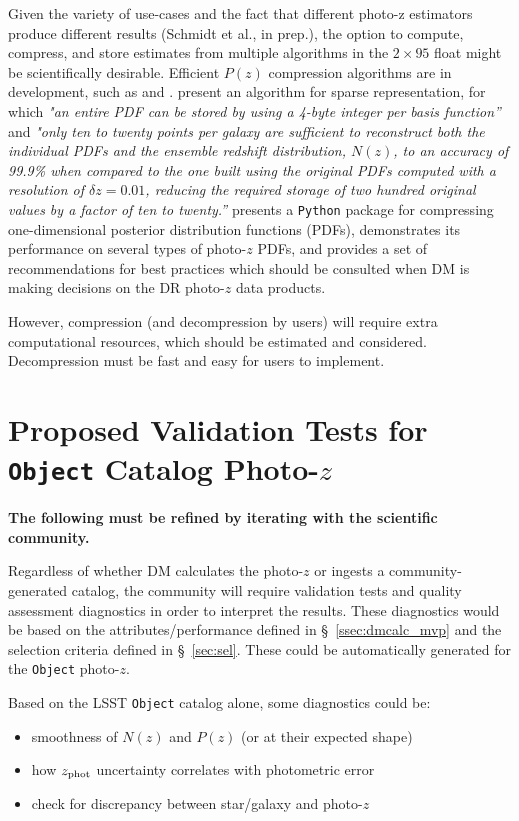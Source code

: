 \documentclass[DM,lsstdraft,toc]{lsstdoc}
\begin{document}
Given the variety of use-cases and the fact that different photo-z estimators produce different results (Schmidt et al., in prep.), the option to compute, compress, and store estimates from multiple algorithms in the $2\times95$ float might be scientifically desirable.
Efficient $P(z)$ compression algorithms are in development, such as \citet{2014MNRAS.441.3550C} and \citet{2018AJ....156...35M}.
\citet{2014MNRAS.441.3550C} present an algorithm for sparse representation, for which {\it "an entire PDF can be stored by using a 4-byte integer per basis function''} and {\it "only ten to twenty points per galaxy are sufficient to reconstruct both the individual PDFs and the ensemble redshift distribution, $N(z)$, to an accuracy of 99.9\% when compared to the one built using the original PDFs computed with a resolution of $\delta z = 0.01$, reducing the required storage of two hundred original values by a factor of ten to twenty.''} 
\citet{2018AJ....156...35M} presents a {\tt Python} package for compressing one-dimensional posterior distribution functions (PDFs), demonstrates its performance on several types of photo-$z$ PDFs, and provides a set of recommendations for best practices which should be consulted when DM is making decisions on the DR photo-$z$ data products.

However, compression (and decompression by users) will require extra computational resources, which should be estimated and considered.
Decompression must be fast and easy for users to implement.



\clearpage
\section{Proposed Validation Tests for {\tt Object} Catalog Photo-$z$} \label{sec:validation}

{\bf The following must be refined by iterating with the scientific community.}

Regardless of whether DM calculates the photo-$z$ or ingests a community-generated catalog, the community will require validation tests and quality assessment diagnostics in order to interpret the results.
These diagnostics would be based on the attributes/performance defined in \S~\ref{ssec:dmcalc_mvp} and the selection criteria defined in \S~\ref{sec:sel}. 
These could be automatically generated for the {\tt Object} photo-$z$.

Based on the LSST {\tt Object} catalog alone, some diagnostics could be:
\begin{itemize}%
\item smoothness of $N(z)$ and $P(z)$ (or at their expected shape)
\item how $z_{\rm phot}$ uncertainty correlates with photometric error
\item check for discrepancy between star/galaxy and photo-$z$
\end{itemize}
\end{document}
